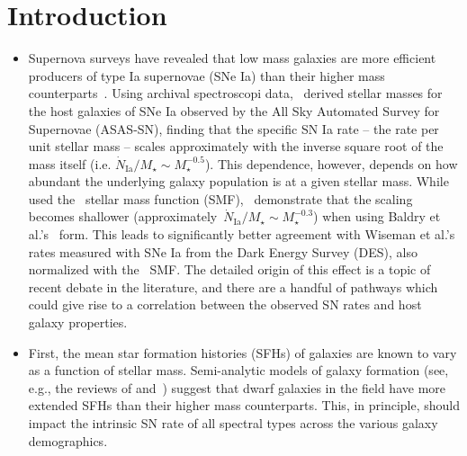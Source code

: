 \documentclass[ms.tex]{subfiles}
\begin{document}
\section{Introduction}
\label{sec:intro}

\begin{itemize}

	\item Supernova surveys have revealed that low mass galaxies are
	more efficient producers of type Ia supernovae (SNe Ia) than their higher
	mass counterparts~\citep[e.g.][]{Mannucci2005}.
	Using archival spectroscopi data,~\citet{Brown2019} derived stellar
	masses for the host galaxies of SNe Ia observed by the All Sky
	Automated Survey for Supernovae (ASAS-SN), finding that the specific SN
	Ia rate -- the rate per unit stellar mass -- scales approximately with
	the inverse square root of the mass itself (i.e.
	$\dot{N}_\text{Ia} / M_\star \sim M_\star^{-0.5}$).
	This dependence, however, depends on how abundant the underlying galaxy
	population is at a given stellar mass.
	While~\citet{Brown2019} used the~\citet{Bell2003} stellar mass function
	(SMF),~\citet{Gandhi2022} demonstrate that the scaling becomes shallower
	(approximately~$\dot{N}_\text{Ia} / M_\star \sim M_\star^{-0.3}$) when
	using Baldry et al.'s~\citeyear{Baldry2012} form.
	This leads to significantly better agreement with Wiseman et al.'s
	\citeyear{Wiseman2021} rates measured with SNe Ia from the Dark Energy
	Survey (DES), also normalized with the~\citet{Baldry2012} SMF.
	The detailed origin of this effect is a topic of recent debate in
	the literature, and there are a handful of pathways which could give rise
	to a correlation between the observed SN rates and host galaxy properties.

	\item First, the mean star formation histories (SFHs) of galaxies are known
	to vary as a function of stellar mass.
	Semi-analytic models of galaxy formation (see, e.g., the reviews of
	\citealp{Baugh2006} and~\citealp*{Somerville2015a}) suggest that dwarf
	galaxies in the field have more extended SFHs than their higher mass
	counterparts.
	This, in principle, should impact the intrinsic SN rate of all spectral
	types across the various galaxy demographics.


\end{itemize}
\end{document}
